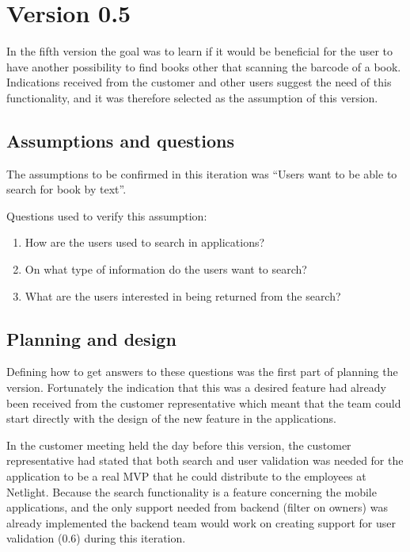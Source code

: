 \section{Version 0.5}
In the fifth version the goal was to learn if it would be beneficial for the user to have another possibility to find books other that scanning the barcode of a book. Indications received from the customer and other users suggest the need of this functionality, and it was therefore selected as the assumption of this version. 
\subsection{Assumptions and questions}
The assumptions to be confirmed in this iteration was “Users want to be able to search for book by text”.

Questions used to verify this assumption:
\begin{enumerate}
    \item How are the users used to search in applications?
    \item On what type of information do the users want to search?
    \item What are the users interested in being returned from the search?
\end{enumerate}

\subsection{Planning and design}
Defining how to get answers to these questions was the first part of planning the version. Fortunately the indication that this was a desired feature had already been received from the customer representative which meant that the team could start directly with the design of the new feature in the applications. 

In the customer meeting held the day before this version, the customer representative had stated that both search and user validation was needed for the application to be a real \gls{MVP} that he could distribute to the employees at Netlight. Because the search functionality is a feature concerning the mobile applications, and the only support needed from \gls{backend} (filter on owners) was already implemented the \gls{backend} team would work on creating support for user validation (0.6) during this iteration.

